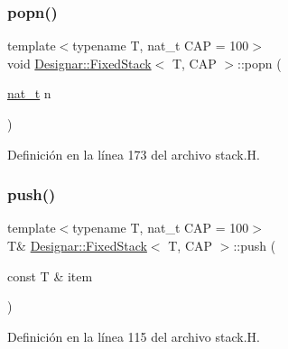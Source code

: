 \mbox{\label{class_designar_1_1_fixed_stack_a9df4fb5afc82545ef1a27eb71bdd84cd}} 
\subsubsection{\texorpdfstring{popn()}{popn()}}
{\footnotesize\ttfamily template$<$typename T, nat\+\_\+t C\+AP = 100$>$ \\
void \hyperlink{class_designar_1_1_fixed_stack}{Designar\+::\+Fixed\+Stack}$<$ T, C\+AP $>$\+::popn (\begin{DoxyParamCaption}\item[{\hyperlink{namespace_designar_aa72662848b9f4815e7bf31a7cf3e33d1}{nat\+\_\+t}}]{n }\end{DoxyParamCaption})\hspace{0.3cm}{\ttfamily [inline]}}



Definición en la línea 173 del archivo stack.\+H.

\mbox{\label{class_designar_1_1_fixed_stack_a2c6786c06798604aaa851e0589c7ba75}} 
\subsubsection{\texorpdfstring{push()}{push()}\hspace{0.1cm}{\footnotesize\ttfamily [1/2]}}
{\footnotesize\ttfamily template$<$typename T, nat\+\_\+t C\+AP = 100$>$ \\
T\& \hyperlink{class_designar_1_1_fixed_stack}{Designar\+::\+Fixed\+Stack}$<$ T, C\+AP $>$\+::push (\begin{DoxyParamCaption}\item[{const T \&}]{item }\end{DoxyParamCaption})\hspace{0.3cm}{\ttfamily [inline]}}



Definición en la línea 115 del archivo stack.\+H.

\mbox{\label{class_designar_1_1_fixed_stack_ac41dfc3fd83bc3b0176e37dcfd600f70}} 
